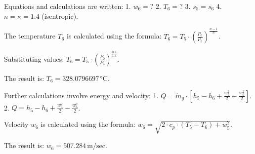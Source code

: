 Equations and calculations are written:  
1. \( w_6 = ? \)  
2. \( T_6 = ? \)  
3. \( s_5 = s_6 \)  
4. \( n = \kappa = 1.4 \) (isentropic).  

The temperature \( T_6 \) is calculated using the formula:  
\( T_6 = T_5 \cdot \left( \frac{P_6}{P_5} \right)^{\frac{n-1}{n}} \).  

Substituting values:  
\( T_6 = T_5 \cdot \left( \frac{P_0}{P_5} \right)^{\frac{0.4}{1.4}} \).  

The result is:  
\( T_6 = 328.0796697 \, \text{°C} \).  

Further calculations involve energy and velocity:  
1. \( Q = \dot{m}_g \cdot \left[ h_5 - h_6 + \frac{w_5^2}{2} - \frac{w_6^2}{2} \right] \).  
2. \( Q = h_5 - h_6 + \frac{w_5^2}{2} - \frac{w_6^2}{2} \).  

Velocity \( w_6 \) is calculated using the formula:  
\( w_6 = \sqrt{2 \cdot c_p \cdot (T_5 - T_6) + w_5^2} \).  

The result is:  
\( w_6 = 507.284 \, \text{m/sec} \).